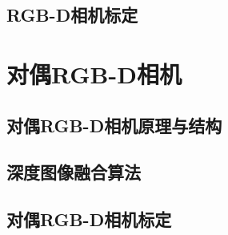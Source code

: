 \subsection{RGB-D相机标定}

\section{对偶RGB-D相机}

\subsection{对偶RGB-D相机原理与结构}

\subsection{深度图像融合算法}

\subsection{对偶RGB-D相机标定}
